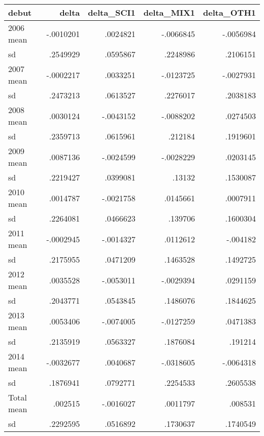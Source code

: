 \begin{center}
\begin{tabular} {@{} l r r r r @{}} \\ \hline
\textbf{   debut } & \textbf{     delta} & \textbf{  delta\_SCI1} & \textbf{  delta\_MIX1} & \textbf{  delta\_OTH1} \\
\hline
2006         mean  &  -.0010201 &   .0024821 &  -.0066845 &  -.0056984 \\
               sd  &   .2549929 &   .0595867 &   .2248986 &   .2106151 \\
2007         mean  &  -.0002217 &   .0033251 &  -.0123725 &  -.0027931 \\
               sd  &   .2473213 &   .0613527 &   .2276017 &   .2038183 \\
2008         mean  &   .0030124 &  -.0043152 &  -.0088202 &   .0274503 \\
               sd  &   .2359713 &   .0615961 &    .212184 &   .1919601 \\
2009         mean  &   .0087136 &  -.0024599 &  -.0028229 &   .0203145 \\
               sd  &   .2219427 &   .0399081 &     .13132 &   .1530087 \\
2010         mean  &   .0014787 &  -.0021758 &   .0145661 &   .0007911 \\
               sd  &   .2264081 &   .0466623 &    .139706 &   .1600304 \\
2011         mean  &  -.0002945 &  -.0014327 &   .0112612 &   -.004182 \\
               sd  &   .2175955 &   .0471209 &   .1463528 &   .1492725 \\
2012         mean  &   .0035528 &  -.0053011 &  -.0029394 &   .0291159 \\
               sd  &   .2043771 &   .0543845 &   .1486076 &   .1844625 \\
2013         mean  &   .0053406 &  -.0074005 &  -.0127259 &   .0471383 \\
               sd  &   .2135919 &   .0563327 &   .1876084 &    .191214 \\
2014         mean  &  -.0032677 &   .0040687 &  -.0318605 &  -.0064318 \\
               sd  &   .1876941 &   .0792771 &   .2254533 &   .2605538 \\
Total        mean  &    .002515 &  -.0016027 &   .0011797 &    .008531 \\
               sd  &   .2292595 &   .0516892 &   .1730637 &   .1740549 \\
\hline

\end{tabular}
\end{center}